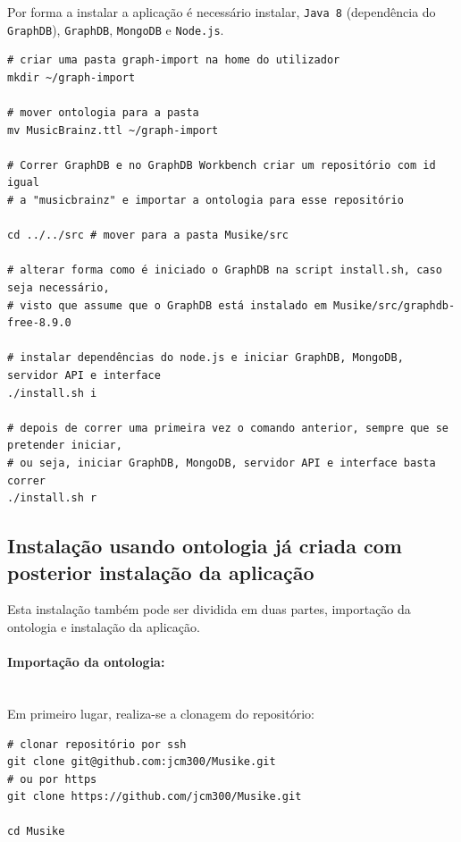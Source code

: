 \documentclass{article}
\begin{document}
Por forma a instalar a aplicação é necessário instalar, \texttt{Java 8} (dependência do \texttt{GraphDB}), \texttt{GraphDB}, \texttt{MongoDB} e \texttt{Node.js}.

\begin{framed}
\begin{verbatim}
# criar uma pasta graph-import na home do utilizador
mkdir ~/graph-import

# mover ontologia para a pasta
mv MusicBrainz.ttl ~/graph-import

# Correr GraphDB e no GraphDB Workbench criar um repositório com id igual 
# a "musicbrainz" e importar a ontologia para esse repositório

cd ../../src # mover para a pasta Musike/src

# alterar forma como é iniciado o GraphDB na script install.sh, caso seja necessário,
# visto que assume que o GraphDB está instalado em Musike/src/graphdb-free-8.9.0

# instalar dependências do node.js e iniciar GraphDB, MongoDB, servidor API e interface
./install.sh i

# depois de correr uma primeira vez o comando anterior, sempre que se pretender iniciar,
# ou seja, iniciar GraphDB, MongoDB, servidor API e interface basta correr
./install.sh r
\end{verbatim}
\end{framed}

\subsection{Instalação usando ontologia já criada com posterior instalação da aplicação}

Esta instalação também pode ser dividida em duas partes, importação da ontologia e instalação da aplicação.

\paragraph{Importação da ontologia:}\mbox{}\\

Em primeiro lugar, realiza-se a clonagem do repositório:

\begin{framed}
\begin{verbatim}
# clonar repositório por ssh
git clone git@github.com:jcm300/Musike.git
# ou por https
git clone https://github.com/jcm300/Musike.git

cd Musike
\end{verbatim}
\end{framed}
\end{document}
